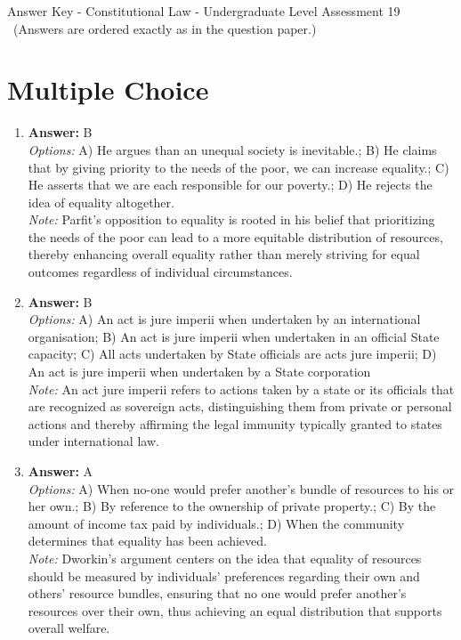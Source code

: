 \documentclass[12pt]{article}
\begin{document}
\begin{center}
Answer Key - Constitutional Law - Undergraduate Level Assessment 19 \
\small (Answers are ordered exactly as in the question paper.)
\end{center}

\section*{Multiple Choice}
\begin{enumerate}[label=\arabic*.]
\item \textbf{Answer:} B
\\ \textit{Options:} A) He argues than an unequal society is inevitable.; B) He claims that by giving priority to the needs of the poor, we can increase equality.; C) He asserts that we are each responsible for our poverty.; D) He rejects the idea of equality altogether.
\\ \textit{Note:} Parfit's opposition to equality is rooted in his belief that prioritizing the needs of the poor can lead to a more equitable distribution of resources, thereby enhancing overall equality rather than merely striving for equal outcomes regardless of individual circumstances.
\item \textbf{Answer:} B
\\ \textit{Options:} A) An act is jure imperii when undertaken by an international organisation; B) An act is jure imperii when undertaken in an official State capacity; C) All acts undertaken by State officials are acts jure imperii; D) An act is jure imperii when undertaken by a State corporation
\\ \textit{Note:} An act jure imperii refers to actions taken by a state or its officials that are recognized as sovereign acts, distinguishing them from private or personal actions and thereby affirming the legal immunity typically granted to states under international law.
\item \textbf{Answer:} A
\\ \textit{Options:} A) When no-one would prefer another's bundle of resources to his or her own.; B) By reference to the ownership of private property.; C) By the amount of income tax paid by individuals.; D) When the community determines that equality has been achieved.
\\ \textit{Note:} Dworkin's argument centers on the idea that equality of resources should be measured by individuals' preferences regarding their own and others' resource bundles, ensuring that no one would prefer another's resources over their own, thus achieving an equal distribution that supports overall welfare.

\end{enumerate}
\end{document}
